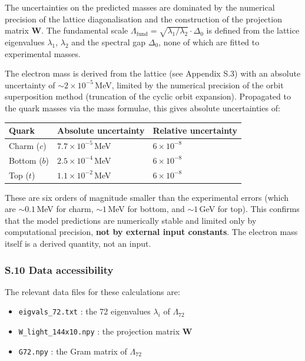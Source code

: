 \documentclass[11pt]{article}
\providecommand{\tightlist}{\setlength{\itemsep}{2pt}\setlength{\parskip}{6pt}}
\providecommand{\tightlist}{%
  \setlength{\itemsep}{2pt}\setlength{\parskip}{6pt}
}
\begin{document}
The uncertainties on the predicted masses are dominated by the numerical
precision of the lattice diagonalisation and the construction of the
projection matrix \(\mathbf{W}\). The fundamental scale
\(\Lambda_{\text{fund}} = \sqrt{\lambda_1/\lambda_2} \cdot \Delta_0\) is
defined from the lattice eigenvalues \(\lambda_1\), \(\lambda_2\) and
the spectral gap \(\Delta_0\), none of which are fitted to experimental
masses.

The electron mass is derived from the lattice (see Appendix S.3) with an
absolute uncertainty of \(\sim 2 \times 10^{-5}\)\,MeV, limited by the
numerical precision of the orbit superposition method (truncation of the
cyclic orbit expansion). Propagated to the quark masses via the mass
formulae, this gives absolute uncertainties of:

\begin{longtable}[]{@{}lll@{}}
\toprule
Quark & Absolute uncertainty & Relative uncertainty \\
\midrule
\endhead
Charm (\(c\)) & \(7.7 \times 10^{-5}\)\,MeV & \(6 \times 10^{-8}\) \\
Bottom (\(b\)) & \(2.5 \times 10^{-4}\)\,MeV & \(6 \times 10^{-8}\) \\
Top (\(t\)) & \(1.1 \times 10^{-2}\)\,MeV & \(6 \times 10^{-8}\) \\
\bottomrule
\end{longtable}

These are six orders of magnitude smaller than the experimental errors
(which are \(\sim 0.1\)\,MeV for charm, \(\sim 1\)\,MeV for bottom, and
\(\sim 1\)\,GeV for top). This confirms that the model predictions are
numerically stable and limited only by computational precision,
\textbf{not by external input constants}. The electron mass itself is a
derived quantity, not an input.

\hypertarget{s.10-data-accessibility}{%
\subsubsection{S.10 Data accessibility}\label{s.10-data-accessibility}}

The relevant data files for these calculations are:

\begin{itemize}
\tightlist
\item
  \texttt{eigvals\_72.txt} : the 72 eigenvalues \(\lambda_i\) of
  \(\Lambda_{72}\)
\item
  \texttt{W\_light\_144x10.npy} : the projection matrix \(\mathbf{W}\)
\item
  \texttt{G72.npy} : the Gram matrix of \(\Lambda_{72}\)
\end{itemize}
\end{document}
